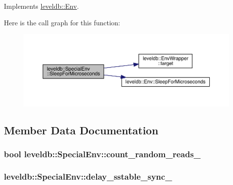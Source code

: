 Implements \hyperlink{classleveldb_1_1_env_a43ad838cfb08db3d9e2197800cd33312}{leveldb\+::\+Env}.



Here is the call graph for this function\+:\nopagebreak
\begin{figure}[H]
\begin{center}
\leavevmode
\includegraphics[width=350pt]{classleveldb_1_1_special_env_afcceb315ff4d8a96805b71a41502da94_cgraph}
\end{center}
\end{figure}




\subsection{Member Data Documentation}
\hypertarget{classleveldb_1_1_special_env_aaf50860248689bda9993dfdcfb53855a}{}
\subsubsection[{count\+\_\+random\+\_\+reads\+\_\+}]{\setlength{\rightskip}{0pt plus 5cm}bool leveldb\+::\+Special\+Env\+::count\+\_\+random\+\_\+reads\+\_\+}\label{classleveldb_1_1_special_env_aaf50860248689bda9993dfdcfb53855a}
\hypertarget{classleveldb_1_1_special_env_afa74041672c18ae40514fe461dace103}{}
\subsubsection[{delay\+\_\+sstable\+\_\+sync\+\_\+}]{ leveldb\+::\+Special\+Env\+::delay\+\_\+sstable\+\_\+sync\+\_\+}\label{classleveldb_1_1_special_env_afa74041672c18ae40514fe461dace103}
\hypertarget{classleveldb_1_1_special_env_a21c9400bf22bd43f75349677b4d3413b}{}
